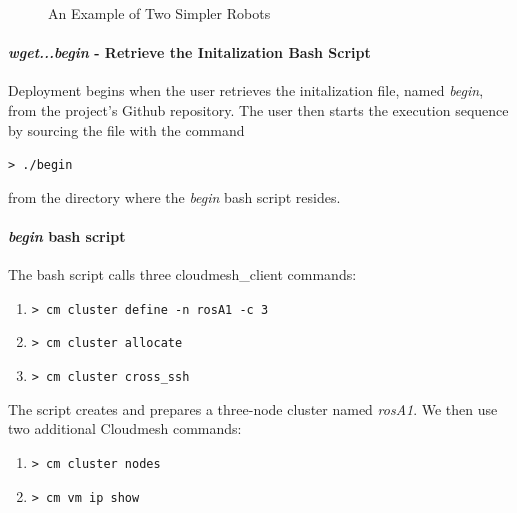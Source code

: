\documentclass[9pt,twocolumn,twoside]{../../styles/osajnl}
\begin{document}
\begin{figure}[htbp]
\centering
{}
\caption{An Example of Two Simpler Robots}
\label{fig:simplerRobots}
\end{figure}

\paragraph{\textit{wget...begin} - Retrieve the Initalization Bash Script}
Deployment begins when the user retrieves the initalization file, named \textit{begin}, from the project's Github repository.  The user then starts the execution sequence by sourcing the file with the command

{\color{black} \lstinline[style=BashInputStyle]!> ./begin! }

from the directory where the \textit{begin} bash script resides.  

\paragraph{\textit{begin} bash script}
The bash script calls three cloudmesh\_client commands: 

\begin{enumerate}
\setlength\itemsep{-6pt}
\item {\lstinline[style=BashInputStyle]!> cm cluster define -n rosA1 -c 3! }
\item {\lstinline[style=BashInputStyle]!> cm cluster allocate! } 
\item {\lstinline[style=BashInputStyle]!> cm cluster cross_ssh! } 
\end{enumerate}

The script creates and prepares a three-node cluster named \textit{rosA1}.  
We then use two additional Cloudmesh commands:

\begin{enumerate}
\setlength\itemsep{-6pt}
\item  {\lstinline[style=BashInputStyle]!> cm cluster nodes! } 
\item  {\lstinline[style=BashInputStyle]!> cm vm ip show! } 
\end{enumerate}
\end{document}
